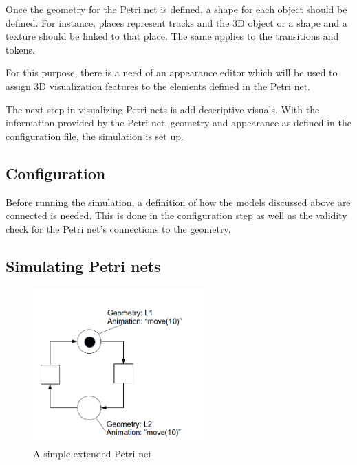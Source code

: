 Once the geometry for the Petri net is defined, a shape for each object should be defined. For instance, places represent tracks and the 3D object or a shape and a texture should be linked to that place. The same applies to the transitions and tokens.

For this purpose, there is a need of an appearance editor which will be used to assign 3D visualization features to the elements defined in the Petri net.

The next step in visualizing Petri nets is add descriptive visuals. With the information provided by the Petri net, geometry and appearance as defined in the configuration file, the simulation is set up.

\subsection{Configuration}

Before running the simulation, a definition of how the models discussed above are connected is needed. This is done in the configuration step as well as the validity check for the Petri net's connections to the geometry. 

\subsection{Simulating Petri nets}

\begin{figure}[htp]
\begin{center}
	\includegraphics[width=0.6\textwidth]{image/example_petrinet.png}
	\caption{A simple extended Petri net}
	\label{fig:example_petrinet}
\end{center}
\end{figure}

